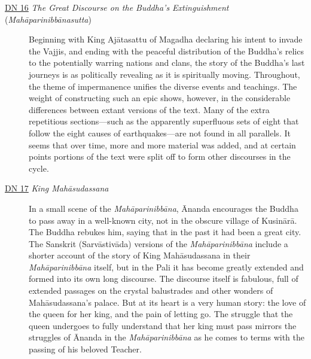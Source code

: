 \documentclass[12pt,openany]{book}%
\begin{document}
\begin{description}%
\item[\href{https://suttacentral.net/dn16}{DN 16} \textit{The Great Discourse on the Buddha’s Extinguishment} (\textit{\textsanskrit{Mahāparinibbānasutta}})] Beginning with King \textsanskrit{Ajātasattu} of Magadha declaring his intent to invade the Vajjis, and ending with the peaceful distribution of the Buddha’s relics to the potentially warring nations and clans, the story of the Buddha’s last journeys is as politically revealing as it is spiritually moving. Throughout, the theme of impermanence unifies the diverse events and teachings. The weight of constructing such an epic shows, however, in the considerable differences between extant versions of the text. Many of the extra repetitious sections—such as the apparently superfluous sets of eight that follow the eight causes of earthquakes—are not found in all parallels. It seems that over time, more and more material was added, and at certain points portions of the text were split off to form other discourses in the cycle.%
\item[\href{https://suttacentral.net/dn17}{DN 17} \textit{King \textsanskrit{Mahāsudassana}}] In a small scene of the \textit{\textsanskrit{Mahāparinibbāna}}, Ānanda encourages the Buddha to pass away in a well-known city, not in the obscure village of \textsanskrit{Kusinārā}. The Buddha rebukes him, saying that in the past it had been a great city. The Sanskrit (\textsanskrit{Sarvāstivāda}) versions of the \textit{\textsanskrit{Mahāparinibbāna}} include a shorter account of the story of King \textsanskrit{Mahāsudassana} in their \textit{\textsanskrit{Mahāparinibbāna}} itself, but in the Pali it has become greatly extended and formed into its own long discourse. The discourse itself is fabulous, full of extended passages on the crystal balustrades and other wonders of \textsanskrit{Mahāsudassana}’s palace. But at its heart is a very human story: the love of the queen for her king, and the pain of letting go. The struggle that the queen undergoes to fully understand that her king must pass mirrors the struggles of Ānanda in the \textit{\textsanskrit{Mahāparinibbāna}} as he comes to terms with the passing of his beloved Teacher.%

\end{description}
\end{document}
